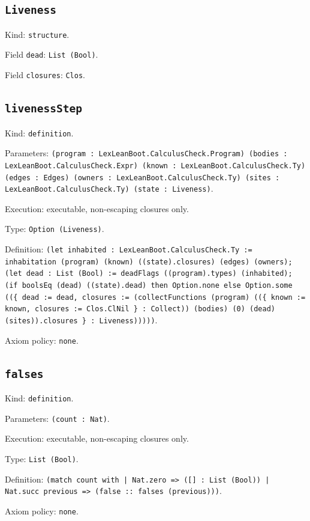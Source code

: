 \documentclass[11pt]{article}
\begin{document}
\subsection*{\texttt{Liveness}}
\noindent Kind: \texttt{structure}.\par
\noindent Field \texttt{dead}: \texttt{List (Bool)}.\par
\noindent Field \texttt{closures}: \texttt{Clos}.\par
\subsection*{\texttt{livenessStep}}
\noindent Kind: \texttt{definition}.\par
\noindent Parameters: \texttt{(program : LexLeanBoot.CalculusCheck.Program) (bodies : LexLeanBoot.CalculusCheck.Expr) (known : LexLeanBoot.CalculusCheck.Ty) (edges : Edges) (owners : LexLeanBoot.CalculusCheck.Ty) (sites : LexLeanBoot.CalculusCheck.Ty) (state : Liveness)}.\par
\noindent Execution: executable, non-escaping closures only.\par
\noindent Type: \texttt{Option (Liveness)}.\par
\noindent Definition: \texttt{(let inhabited : LexLeanBoot.CalculusCheck.Ty := inhabitation (program) (known) ((state).closures) (edges) (owners); (let dead : List (Bool) := deadFlags ((program).types) (inhabited); (if boolsEq (dead) ((state).dead) then Option.none else Option.some ((\{ dead := dead, closures := (collectFunctions (program) ((\{ known := known, closures := Clos.ClNil \} : Collect)) (bodies) (0) (dead) (sites)).closures \} : Liveness)))))}.\par
\noindent Axiom policy: \texttt{none}.\par
\subsection*{\texttt{falses}}
\noindent Kind: \texttt{definition}.\par
\noindent Parameters: \texttt{(count : Nat)}.\par
\noindent Execution: executable, non-escaping closures only.\par
\noindent Type: \texttt{List (Bool)}.\par
\noindent Definition: \texttt{(match count with | Nat.zero => ([] : List (Bool)) | Nat.succ previous => (false :: falses (previous)))}.\par
\noindent Axiom policy: \texttt{none}.\par
\end{document}
